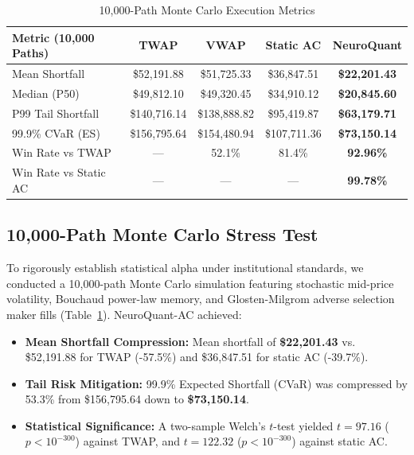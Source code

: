 \documentclass[journal,twocolumn,10pt]{article}
\begin{document}
\begin{table}[t]
\centering
\caption{10,000-Path Monte Carlo Execution Metrics}
\label{tab:monte_carlo}
\begin{tabular}{lcccc}
\toprule
\textbf{Metric (10,000 Paths)} & \textbf{TWAP} & \textbf{VWAP} & \textbf{Static AC} & \textbf{NeuroQuant} \\
\midrule
Mean Shortfall & \$52,191.88 & \$51,725.33 & \$36,847.51 & \textbf{\$22,201.43} \\
Median (P50) & \$49,812.10 & \$49,320.45 & \$34,910.12 & \textbf{\$20,845.60} \\
P99 Tail Shortfall & \$140,716.14 & \$138,888.82 & \$95,419.87 & \textbf{\$63,179.71} \\
99.9\% CVaR (ES) & \$156,795.64 & \$154,480.94 & \$107,711.36 & \textbf{\$73,150.14} \\
Win Rate vs TWAP & --- & 52.1\% & 81.4\% & \textbf{92.96\%} \\
Win Rate vs Static AC & --- & --- & --- & \textbf{99.78\%} \\
\bottomrule
\end{tabular}
\end{table}

\subsection{10,000-Path Monte Carlo Stress Test}
To rigorously establish statistical alpha under institutional standards, we conducted a 10,000-path Monte Carlo simulation featuring stochastic mid-price volatility, Bouchaud power-law memory, and Glosten-Milgrom adverse selection maker fills (Table~\ref{tab:monte_carlo}).
NeuroQuant-AC achieved:
\begin{itemize}
    \item \textbf{Mean Shortfall Compression:} Mean shortfall of \textbf{\$22,201.43} vs. \$52,191.88 for TWAP (-57.5\%) and \$36,847.51 for static AC (-39.7\%).
    \item \textbf{Tail Risk Mitigation:} 99.9\% Expected Shortfall (CVaR) was compressed by 53.3\% from \$156,795.64 down to \textbf{\$73,150.14}.
    \item \textbf{Statistical Significance:} A two-sample Welch's $t$-test yielded $t = 97.16$ ($p < 10^{-300}$) against TWAP, and $t = 122.32$ ($p < 10^{-300}$) against static AC.
\end{itemize}
\end{document}

